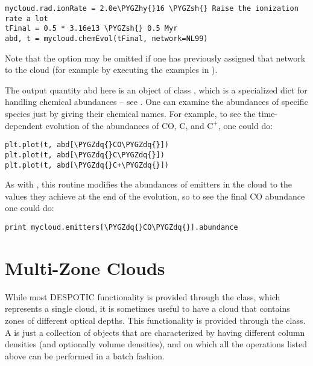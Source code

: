 \documentclass[letterpaper,10pt,english]{sphinxmanual}
\def\PYGZsh{\char`\#}
\def\PYGZhy{\char`\-}
\def\PYGZdq{\char`\"}
\begin{document}
\begin{Verbatim}[commandchars=\\\{\}]
mycloud.rad.ionRate = 2.0e\PYGZhy{}16 \PYGZsh{} Raise the ionization rate a lot
tFinal = 0.5 * 3.16e13 \PYGZsh{} 0.5 Myr
abd, t = mycloud.chemEvol(tFinal, network=NL99)
\end{Verbatim}

Note that the  option may be omitted if one has
previously assigned that network to the cloud (for example by
executing the examples in {\hyperref[functions:ssec\string-chem\string-eq]{}}).

The output quantity abd here is an object of class ,
which is a specialized dict for handling chemical abundances -- see
{\hyperref[chemistry:sssec\string-abundancedict]{}}. One can examine the abundances of specific
species just by giving their chemical names. For example, to see
the time-dependent evolution of the abundances of CO, C, and
\(\mathrm{C}^+\), one could do:

\begin{Verbatim}[commandchars=\\\{\}]
plt.plot(t, abd[\PYGZdq{}CO\PYGZdq{}])
plt.plot(t, abd[\PYGZdq{}C\PYGZdq{}])
plt.plot(t, abd[\PYGZdq{}C+\PYGZdq{}])
\end{Verbatim}

As with , this routine modifies the abundances of
emitters in the cloud to the values they achieve at the end of the
evolution, so to see the final CO abundance one could do:

\begin{Verbatim}[commandchars=\\\{\}]
print mycloud.emitters[\PYGZdq{}CO\PYGZdq{}].abundance
\end{Verbatim}


\section{Multi-Zone Clouds}
\label{functions:multi-zone-clouds}
While most DESPOTIC functionality is provided through the 
class, which represents a single cloud, it is sometimes useful to have
a cloud that contains zones of different optical depths. This
functionality is provided through the  class. A
 is just a collection of  objects that are
characterized by having different column densities (and optionally
volume densities), and on which all the operations listed above can be
performed in a batch fashion.
\end{document}

